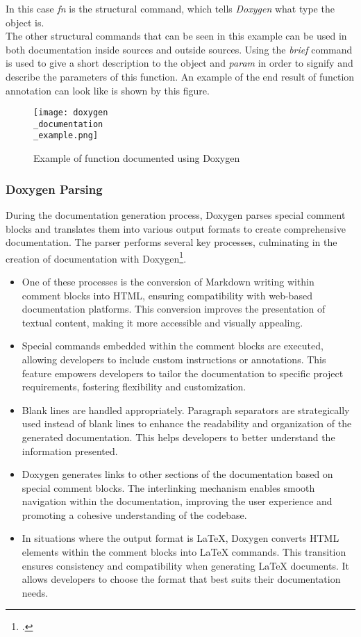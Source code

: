 In this case \textit{fn} is the structural command, which tells \textit{Doxygen} what type the object is.\\

The other structural commands that can be seen in this example can be used in both documentation inside sources and outside sources. Using the \textit{brief} command 
is used to give a short description to the object and \textit{param} in order to signify and describe the parameters of this function. An example of the end result of
function annotation can look like is shown by this figure.\\

\begin{figure}[h]
    \centering
    \texttt{[image: doxygen\\\_documentation\\\_example.png]} 
	\caption{Example of function documented using Doxygen}
	\label{pic:doxygen_documentation_example}
\end{figure}

\subsubsection{Doxygen Parsing}

During the documentation generation process, Doxygen parses special comment blocks and translates them into various output formats to create comprehensive 
documentation. The parser performs several key processes, culminating in the creation of documentation with Doxygen\footcite{doxygen_manual}.

\begin{itemize}
    \item[1] One of these processes is the conversion of Markdown writing within comment blocks into HTML, ensuring compatibility with web-based documentation platforms. This conversion improves the presentation of textual content, making it more accessible and visually appealing.
    \item[2] Special commands embedded within the comment blocks are executed, allowing developers to include custom instructions or annotations. This feature empowers developers to tailor the documentation to specific project requirements, fostering flexibility and customization.
    \item[3] Blank lines are handled appropriately. Paragraph separators are strategically used instead of blank lines to enhance the readability and organization of the generated documentation. This helps developers to better understand the information presented.
    \item[4] Doxygen generates links to other sections of the documentation based on special comment blocks. The interlinking mechanism enables smooth navigation within the documentation, improving the user experience and promoting a cohesive understanding of the codebase.
    \item[5] In situations where the output format is LaTeX, Doxygen converts HTML elements within the comment blocks into LaTeX commands. This transition ensures consistency and compatibility when generating LaTeX documents. It allows developers to choose the format that best suits their documentation needs.
\end{itemize}

